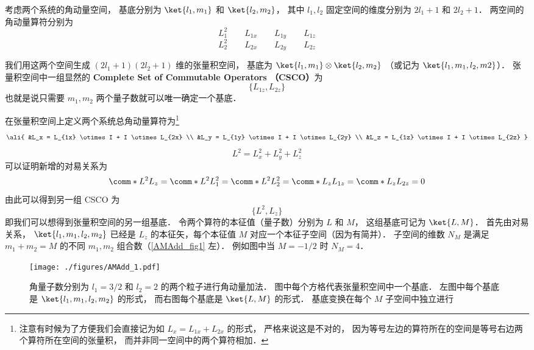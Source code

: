 

考虑两个系统的角动量空间， 基底分别为 $\ket{l_1, m_1}$ 和 $\ket{l_2, m_2}$， 其中 $l_1, l_2$ 固定空间的维度分别为 $2l_1+1$ 和 $2l_2+1$． 两空间的角动量算符分别为
\begin{equation}\label{AMAdd_eq1}
L_1^2 \qquad L_{1x} \qquad L_{1y} \qquad L_{1z}
\end{equation}
\begin{equation}
L_2^2 \qquad L_{2x} \qquad L_{2y} \qquad L_{2z}
\end{equation}

我们用这两个空间生成 $(2l_1+1)(2l_2+1)$ 维的张量积空间， 基底为 $\ket{l_1, m_1}\otimes\ket{l_2, m_2}$ （或记为 $\ket{l_1, m_1, l_2, m2}$）． 张量积空间中一组显然的 \textbf{Complete Set of Commutable Operators （CSCO）}为 %
\begin{equation}
\{L_{1z}, L_{2z}\}
\end{equation}
也就是说只需要 $m_1, m_2$ 两个量子数就可以唯一确定一个基底．

在张量积空间上定义两个系统总角动量算符为\footnote{注意有时候为了方便我们会直接记为如 $L_x = L_{1x} + L_{2x}$ 的形式， 严格来说这是不对的， 因为等号左边的算符所在的空间是等号右边两个算符所在空间的张量积， 而并非同一空间中的两个算符相加．}
\begin{equation}\ali{
&L_x = L_{1x} \otimes I +  I \otimes L_{2x} \\
&L_y = L_{1y} \otimes I +  I \otimes L_{2y} \\
&L_z = L_{1z} \otimes I +  I \otimes L_{2z}
}\end{equation}
\begin{equation}
L^2 = L_x^2 + L_y^2 + L_z^2
\end{equation}
可以证明新增的对易关系为
\begin{equation}
\comm*{L^2}{L_z} = \comm*{L^2}{L_1^2} = \comm*{L^2}{L_2^2} = 
\comm*{L_z}{L_{1z}} = \comm*{L_z}{L_{2z}} = 0
\end{equation}
由此可以得到另一组 CSCO 为 %
\begin{equation}
\{L^2, L_z\}
\end{equation}
即我们可以想得到张量积空间的另一组基底． 令两个算符的本征值（量子数）分别为 $L$  和 $M$， 这组基底可记为 $\ket{L, M}$．  首先由对易关系， $\ket{l_1, m_1, l_2, m_2}$ 已经是 $L_z$ 的本征矢，每个本征值 $M$ 对应一个本征子空间（因为有简并）． 子空间的维数 $N_M$ 是满足 $m_1 + m_2 = M$ 的不同 $m_1,m_2$ 组合数（\autoref{AMAdd_fig1} 左）． 例如图中当 $M = -1/2$ 时 $N_M = 4$．
\begin{figure}[ht]
\centering
\texttt{[image: ./figures/AMAdd\_1.pdf]}
\caption{角量子数分别为 $l_1 = 3/2$ 和 $l_2 = 2$ 的两个粒子进行角动量加法． 图中每个方格代表张量积空间中一个基底． 左图中每个基底是 $\ket{l_1, m_1, l_2, m_2}$ 的形式， 而右图每个基底是 $\ket{L, M}$ 的形式． 基底变换在每个 $M$ 子空间中独立进行} \label{AMAdd_fig1}
\end{figure}

